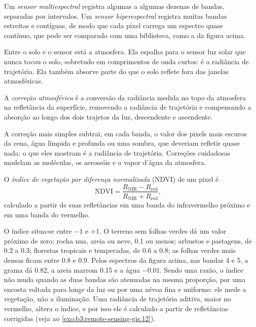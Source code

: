 \begin{definition}\label{def:b3:remote-sensing-gis:sensors}
Um \emph{sensor multiespectral} registra algumas
a algumas dezenas de bandas, separadas por intervalos. Um \emph{sensor
hiperespectral} registra muitas bandas estreitas e contíguas,
de modo que cada pixel carrega um espectro quase contínuo, que pode ser
comparado com uma biblioteca, como a da figura acima.
\end{definition}

Entre o solo e o sensor está a atmosfera. Ela espalha para o sensor luz solar
que nunca tocou o solo, sobretudo em comprimentos de onda curtos: é a
radiância de trajetória. Ela também absorve parte do que o solo reflete
fora das janelas atmosféricas.

\begin{definition}\label{def:b3:remote-sensing-gis:atm-correction}
A \emph{correção atmosférica} é a
conversão da radiância medida no topo da atmosfera na
refletância da superfície, removendo a radiância de trajetória e compensando
a absorção ao longo dos dois trajetos da luz, descendente e ascendente.
\end{definition}

A correção mais simples subtrai, em cada banda, o valor dos pixels mais escuros
da cena, água límpida e profunda ou uma sombra, que deveriam refletir
quase nada: o que eles mostram é a radiância de trajetória. Correções cuidadosas
modelam as moléculas, os aerossóis e o vapor d'água da atmosfera.

\begin{definition}\label{def:b3:remote-sensing-gis:ndvi}
O \emph{índice de vegetação por diferença
normalizada} (NDVI) de um pixel é
\[
\mathrm{NDVI} = \frac{R_\mathrm{NIR} - R_\mathrm{red}}{R_\mathrm{NIR} + R_\mathrm{red}} ,
\]
calculado a partir de suas refletâncias em uma banda do infravermelho próximo e em uma banda do vermelho.
\end{definition}

O índice situa-se entre $-1$ e $+1$. O terreno sem folhas verdes dá um
valor próximo de zero; rocha nua, areia ou neve, \num{0.1} ou menos;
arbustos e pastagens, de 0.2 a 0.3; florestas tropicais e temperadas, de 0.6 a
0.8; as folhas verdes mais densas ficam entre 0.8 e 0.9. Pelos espectros da
figura acima, nas bandas 4 e 5, a grama dá 0.82, a areia marrom
0.15 e a água $-0.01$. Sendo uma razão, o índice não muda quando
as duas bandas são atenuadas na mesma proporção, por uma encosta voltada para longe da
luz ou por uma névoa fina e uniforme: ele mede a vegetação, não a iluminação.
Uma radiância de trajetória aditiva, maior no vermelho, altera o índice,
e por isso ele é calculado a partir de refletâncias corrigidas
(veja ao \cref{exo:b3:remote-sensing-gis:12}).

